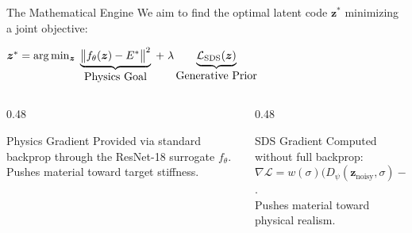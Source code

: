\documentclass[aspectratio=169, 11pt]{beamer}
\newcommand{\zvec}{\bm{z}}
\newcommand{\loss}{\mathcal{L}}
\begin{document}
\begin{frame}{The Mathematical Engine}
  We aim to find the optimal latent code $\zvec^*$ minimizing a joint objective:
  
  \vspace{0.5em}
  \begin{center}
      \Large
      $ \zvec^{*} = \arg\min_{\zvec} \;
      \underbrace{\bigl\| f_\theta(\zvec) - E^* \bigr\|^2}_{\text{\normalsize Physics Goal}} 
      \;+\; \lambda \underbrace{\loss_{\mathrm{SDS}}(\zvec)}_{\text{\normalsize Generative Prior}} $
  \end{center}
  
  \vspace{1em}
  \begin{columns}
      \begin{column}{0.48\textwidth}
          \begin{exampleblock}{Physics Gradient}
              Provided via standard backprop through the ResNet-18 surrogate $f_\theta$. Pushes material toward target stiffness.
          \end{exampleblock}
      \end{column}
      \begin{column}{0.48\textwidth}
          \begin{alertblock}{SDS Gradient}
              Computed without full backprop:
              $\nabla \loss = w(\sigma) \bigl( D_\psi(\zvec_{\text{noisy}}, \sigma) - \zvec \bigr)$.\\
              Pushes material toward physical realism.
          \end{alertblock}
      \end{column}
  \end{columns}
\end{frame}
\end{document}
